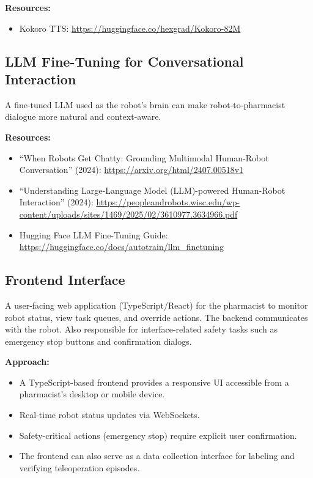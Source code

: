 \documentclass[11pt]{article}
\begin{document}
\textbf{Resources:}
\begin{itemize}[nosep]
    \item Kokoro TTS: \url{https://huggingface.co/hexgrad/Kokoro-82M}
\end{itemize}

\subsection{LLM Fine-Tuning for Conversational Interaction}
A fine-tuned LLM used as the robot's brain can make robot-to-pharmacist dialogue more natural and context-aware.

\textbf{Resources:}
\begin{itemize}[nosep]
    \item ``When Robots Get Chatty: Grounding Multimodal Human-Robot Conversation'' (2024): \url{https://arxiv.org/html/2407.00518v1}
    \item ``Understanding Large-Language Model (LLM)-powered Human-Robot Interaction'' (2024): \url{https://peopleandrobots.wisc.edu/wp-content/uploads/sites/1469/2025/02/3610977.3634966.pdf}
    \item Hugging Face LLM Fine-Tuning Guide: \url{https://huggingface.co/docs/autotrain/llm_finetuning}
\end{itemize}

\subsection{Frontend Interface}
A user-facing web application (TypeScript/React) for the pharmacist to monitor robot status, view task queues, and override actions. The backend communicates with the robot. Also responsible for interface-related safety tasks such as emergency stop buttons and confirmation dialogs.

\textbf{Approach:}
\begin{itemize}[nosep]
    \item A TypeScript-based frontend provides a responsive UI accessible from a pharmacist's desktop or mobile device.
    \item Real-time robot status updates via WebSockets.
    \item Safety-critical actions (emergency stop) require explicit user confirmation.
    \item The frontend can also serve as a data collection interface for labeling and verifying teleoperation episodes.
\end{itemize}
\end{document}
